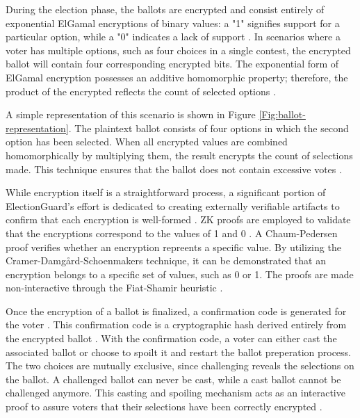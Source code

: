 During the election phase, the ballots are encrypted and consist entirely of exponential ElGamal encryptions of binary values: a "1" signifies support for a particular option, while a "0" indicates a lack of support \cite[11]{eg-paper} \cite[12]{eg-spec}. In scenarios where a voter has multiple options, such as four choices in a single contest, the encrypted ballot will contain four corresponding encrypted bits. The exponential form of ElGamal encryption possesses an additive homomorphic property; therefore, the product of the encrypted reflects the count of selected options \cite[5]{eg-spec}.

A simple representation of this scenario is shown in Figure \ref{Fig:ballot-representation}. The plaintext ballot consists of four options in which the second option has been selected. When all encrypted values are combined homomorphically by multiplying them, the result encrypts the count of selections made. This technique ensures that the ballot does not contain excessive votes \cite[5]{eg-spec}.

While encryption itself is a straightforward process, a significant portion of ElectionGuard's effort is dedicated to creating externally verifiable artifacts to confirm that each encryption is well-formed \cite[3]{eg-spec}. \ac{ZK} proofs are employed to validate that the encryptions correspond to the values of 1 and 0 \cite[11]{eg-paper}. A Chaum-Pedersen proof verifies whether an encryption repreents a specific value. By utilizing the Cramer-Damgård-Schoenmakers technique, it can be demonstrated that an encryption belongs to a specific set of values, such as 0 or 1. The proofs are made non-interactive through the Fiat-Shamir heuristic \cite[6,13]{eg-spec}.

Once the encryption of a ballot is finalized, a confirmation code is generated for the voter \cite[17]{eg-spec}. This confirmation code is a cryptographic hash derived entirely from the encrypted ballot \cite[14]{eg-paper}. With the confirmation code, a voter can either cast the associated ballot or choose to spoilt it and restart the ballot preperation process. The two choices are mutually exclusive, since challenging reveals the selections on the ballot. A challenged ballot can never be cast, while a cast ballot cannot be challenged anymore. This casting and spoiling mechanism acts as an interactive proof to assure voters that their selections have been correctly encrypted \cite[17]{eg-spec} \cite{eg-docs}.

